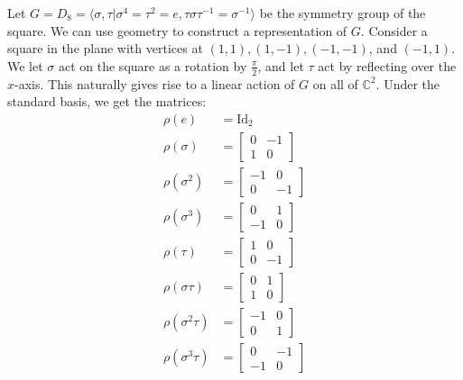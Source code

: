 \begin{example}
Let $G = D_8 = \langle \sigma, \tau |  \sigma^4 = \tau^2 = e, \tau \sigma \tau^{-1} = \sigma^{-1} \rangle$ be the symmetry group of the square.  We can use geometry to construct a representation of $G$.  Consider a square in the plane with vertices at $(1,1), (1,-1), (-1, -1)$, and $(-1, 1)$.  We let $\sigma$ act on the square as a rotation by $\frac{\pi}{2}$, and let $\tau$ act by reflecting over the $x$-axis.  This naturally gives rise to a linear action of $G$ on all of $\mathbb{C}^2$.  Under the standard basis, we get the matrices:
\begin{align*}
\rho( e) &= \text{Id}_2 \\
\rho (\sigma) &= \begin{bmatrix} 0 & -1 \\ 1 & 0  \end{bmatrix} \\
\rho (\sigma^2) &= \begin{bmatrix} -1 & 0 \\ 0 & -1  \end{bmatrix} \\ 
\rho (\sigma^3) &= \begin{bmatrix} 0 & 1 \\ -1 & 0  \end{bmatrix} \\
\rho (\tau) &= \begin{bmatrix} 1 & 0 \\ 0 & -1\end{bmatrix} \\
\rho (\sigma \tau ) &= \begin{bmatrix} 0 & 1 \\ 1 & 0\end{bmatrix} \\
\rho (\sigma^2 \tau) &= \begin{bmatrix} -1 & 0 \\ 0 & 1\end{bmatrix} \\
\rho (\sigma^3 \tau) &= \begin{bmatrix} 0 & -1 \\ -1 & 0\end{bmatrix}
\end{align*}

\end{example}

